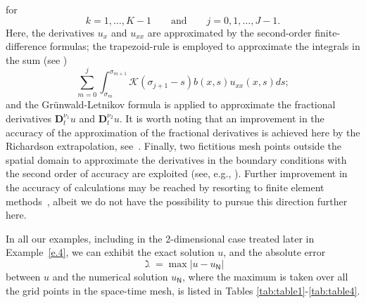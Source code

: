 \documentclass[reqno]{amsart}
\theoremstyle{definition}
\numberwithin{equation}{section}
\begin{document}
for
$$k = 1,\ldots,  K-1\qquad\text{and}\qquad j = 0,1,\ldots,  J-1.$$
Here, the derivatives $u_x$ and $u_{x x}$ are approximated by
the second-order finite-difference formulas; the trapezoid-rule is employed to approximate the integrals in the sum (see \cite{KPSV1})
$$\sum_{m=0}^j\int^{\sigma_{m+1}}_{\sigma_m} {\mathcal{K}}(\sigma_{j+1}-s)b(x,s)u_{xx}(x,s) d s;$$
and the Gr\"unwald-Letnikov formula \cite{DFFL} is applied to approximate the fractional derivatives $\mathbf{D}_{t}^{\nu_1} u$ and $\mathbf{D}_{t}^{\nu_2} u$. It is worth noting that an improvement in the accuracy
of the approximation of the fractional derivatives is achieved here by
the Richardson extrapolation, see~\cite{DFFL}.
Finally, two fictitious mesh points outside the spatial domain to approximate the derivatives in the boundary conditions with the second order of accuracy are exploited (see, e.g., \cite{KPSV1}). Further improvement in the accuracy of calculations may be reached by resorting to finite element methods~\cite{JinLazZ, SVjcp, SVcsa}, albeit we do not have the possibility to pursue this direction further here.

In all our examples, including in the 2-dimensional case
treated later in Example~\ref{e.4},
we can exhibit the exact solution $u$, and the absolute error 
$$\gimel = \max|u-u_{\mathsf{N}}|$$
between $u$ and the numerical solution $u_{\mathsf{N}}$,
where the maximum is taken over all the grid points in the space-time mesh, is listed in Tables \ref{tab:table1}-\ref{tab:table4}.
\end{document}
